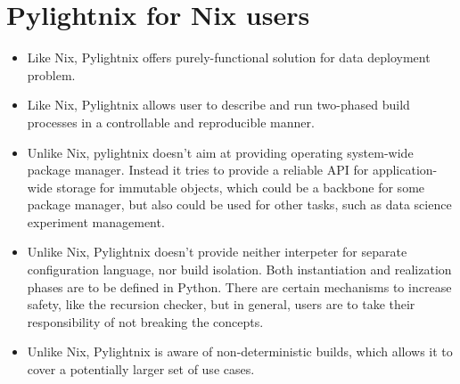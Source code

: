 \section{Pylightnix for Nix users}

\begin{itemize}

  \item Like Nix, Pylightnix offers purely-functional solution for data
    deployment problem.

  \item Like Nix, Pylightnix allows user to describe and run two-phased build
    processes in a controllable and reproducible manner.

  \item Unlike Nix, pylightnix doesn't aim at providing operating system-wide package
    manager. Instead it tries to provide a reliable API for application-wide
    storage for immutable objects, which could be a backbone for some package
    manager, but also could be used for other tasks, such as data science
    experiment management.

  \item Unlike Nix, Pylightnix doesn't provide neither interpeter for separate
    configuration language, nor build isolation. Both instantiation and
    realization phases are to be defined in Python. There are certain mechanisms
    to increase safety, like the recursion checker, but in general, users are
    to take their responsibility of not breaking the concepts.

  \item Unlike Nix, Pylightnix is aware of non-deterministic builds, which allows
    it to cover a potentially larger set of use cases.

\end{itemize}

\par

